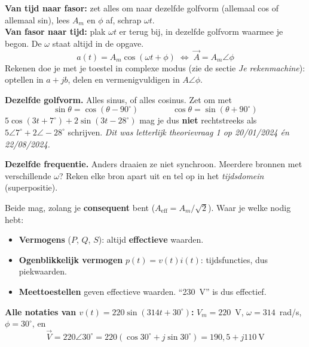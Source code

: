 \documentclass[a4paper,11pt]{article}
\begin{document}
\begin{theorie}
    \textbf{Van tijd naar fasor:} zet alles om naar dezelfde golfvorm (allemaal cos of allemaal sin),
    lees $A_m$ en $\phi$ af, schrap $\omega t$. \\
    \textbf{Van fasor naar tijd:} plak $\omega t$ er terug bij, in dezelfde golfvorm waarmee je begon.
    De $\omega$ staat altijd in de opgave.
    \[a(t) = A_m\cos(\omega t + \phi) \;\Longleftrightarrow\; \vec{A} = A_m\angle\phi\]
    Rekenen doe je met je toestel in complexe modus (zie de sectie \emph{Je rekenmachine}): optellen in
    $a+jb$, delen en vermenigvuldigen in $A\angle\phi$.
\end{theorie}

\begin{waarschuwing}
    \textbf{Dezelfde golfvorm.} Alles sinus, of alles cosinus. Zet om met
    \[\sin\theta = \cos(\theta - 90^\circ) \qquad\qquad \cos\theta = \sin(\theta + 90^\circ)\]
    $5\cos(3t+7^\circ) + 2\sin(3t-28^\circ)$ mag je dus \textbf{niet} rechtstreeks als
    $5\angle 7^\circ + 2\angle -28^\circ$ schrijven.
    \emph{Dit was letterlijk theorievraag 1 op 20/01/2024 én 22/08/2024.}

    \textbf{Dezelfde frequentie.} Anders draaien ze niet synchroon. Meerdere bronnen met
    verschillende $\omega$? Reken elke bron apart uit en tel op in het \emph{tijdsdomein}
    (superpositie).
\end{waarschuwing}

\begin{examenbox}
    Beide mag, zolang je \textbf{consequent} bent ($A_{\text{eff}} = A_m/\sqrt{2}$). Waar je welke nodig hebt:
    \begin{itemize}
        \item \textbf{Vermogens} ($P$, $Q$, $S$): altijd \textbf{effectieve} waarden.
        \item \textbf{Ogenblikkelijk vermogen} $p(t) = v(t)i(t)$: tijdsfuncties, dus piekwaarden.
        \item \textbf{Meettoestellen} geven effectieve waarden. ``230~V'' is dus effectief.
    \end{itemize}
\end{examenbox}

\textbf{Alle notaties van $v(t) = 220\sin(314t + 30^\circ)$:} $V_m = 220$~V, $\omega = 314$~rad/s,
$\phi = 30^\circ$, en
\[\vec{V} = 220\angle 30^\circ = 220(\cos 30^\circ + j\sin 30^\circ) = 190{,}5 + j110\ \text{V}\]
\end{document}
